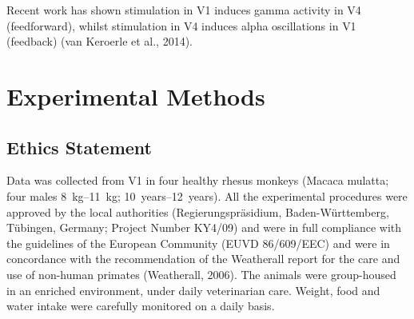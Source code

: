 Recent work has shown stimulation in \ac{V1} induces gamma activity in \ac{V4} (feedforward), whilst stimulation in \ac{V4} induces alpha oscillations in \ac{V1} (feedback) (van Keroerle et al., 2014).
\section{Experimental Methods}
\subsection{Ethics Statement}
Data was collected from \ac{V1} in four healthy rhesus monkeys (Macaca mulatta; four males \SIrange{8}{11}{kg}; \SIrange{10}{12}{years}).
All the experimental procedures were approved by the local authorities (Regierungspr\"asidium, Baden-W\"urttemberg, T\"ubingen, Germany; Project Number KY4/09) and were in full compliance with the guidelines of the European Community (EUVD 86/609/EEC) and were in concordance with the recommendation of the Weatherall report for the care and use of non-human primates (Weatherall, 2006).
The animals were group-housed in an enriched environment, under daily veterinarian care.
Weight, food and water intake were carefully monitored on a daily basis.

